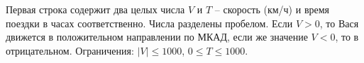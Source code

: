 Первая строка содержит два целых числа $V$ и $T$ -- скорость (км/ч) и время поездки в часах соответственно. Числа разделены пробелом. Если $V>0$, то Вася движется в положительном направлении по МКАД, если же значение $V<0$, то в отрицательном. Ограничения: $|V| \leq 1000$, $0 \leq T \leq 1000$.